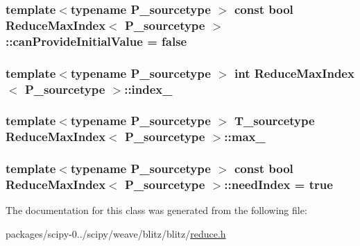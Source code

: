 \subsubsection[{can\+Provide\+Initial\+Value}]{\setlength{\rightskip}{0pt plus 5cm}template$<$typename P\+\_\+sourcetype $>$ const {\bf bool} {\bf Reduce\+Max\+Index}$<$ P\+\_\+sourcetype $>$\+::can\+Provide\+Initial\+Value = {\bf false}\hspace{0.3cm}{\ttfamily [static]}}\label{classReduceMaxIndex_a8474d74231f271258c5100bde38516a1}
\hypertarget{classReduceMaxIndex_aaa66337506289488aa45638fadfb6962}{}
\subsubsection[{index\+\_\+}]{\setlength{\rightskip}{0pt plus 5cm}template$<$typename P\+\_\+sourcetype $>$ int {\bf Reduce\+Max\+Index}$<$ P\+\_\+sourcetype $>$\+::index\+\_\+\hspace{0.3cm}{\ttfamily [protected]}}\label{classReduceMaxIndex_aaa66337506289488aa45638fadfb6962}
\hypertarget{classReduceMaxIndex_af4a613c8c45e85f7871c111fbfa8f2e3}{}
\subsubsection[{max\+\_\+}]{\setlength{\rightskip}{0pt plus 5cm}template$<$typename P\+\_\+sourcetype $>$ {\bf T\+\_\+sourcetype} {\bf Reduce\+Max\+Index}$<$ P\+\_\+sourcetype $>$\+::max\+\_\+\hspace{0.3cm}{\ttfamily [protected]}}\label{classReduceMaxIndex_af4a613c8c45e85f7871c111fbfa8f2e3}
\hypertarget{classReduceMaxIndex_a522b1a3857414ec84aedd65a85975a00}{}
\subsubsection[{need\+Index}]{\setlength{\rightskip}{0pt plus 5cm}template$<$typename P\+\_\+sourcetype $>$ const {\bf bool} {\bf Reduce\+Max\+Index}$<$ P\+\_\+sourcetype $>$\+::need\+Index = {\bf true}\hspace{0.3cm}{\ttfamily [static]}}\label{classReduceMaxIndex_a522b1a3857414ec84aedd65a85975a00}


The documentation for this class was generated from the following file\+:\begin{DoxyCompactItemize}
\item 
packages/scipy-\/0../scipy/weave/blitz/blitz/\hyperlink{reduce_8h}{reduce.\+h}\end{DoxyCompactItemize}
